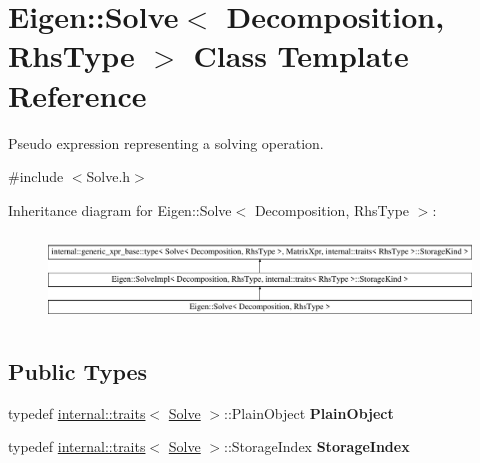 \hypertarget{class_eigen_1_1_solve}{}\section{Eigen\+::Solve$<$ Decomposition, Rhs\+Type $>$ Class Template Reference}
\label{class_eigen_1_1_solve}


Pseudo expression representing a solving operation.  




{\ttfamily \#include $<$Solve.\+h$>$}

Inheritance diagram for Eigen\+::Solve$<$ Decomposition, Rhs\+Type $>$\+:\begin{figure}[H]
\begin{center}
\leavevmode
\includegraphics[height=2.343096cm]{class_eigen_1_1_solve}
\end{center}
\end{figure}
\subsection*{Public Types}
\begin{DoxyCompactItemize}
\item 
\mbox{\label{class_eigen_1_1_solve_a07e840fd2115e2333487c179df5408a9}} 
typedef \mbox{\hyperlink{struct_eigen_1_1internal_1_1traits}{internal\+::traits}}$<$ \mbox{\hyperlink{class_eigen_1_1_solve}{Solve}} $>$\+::Plain\+Object {\bfseries Plain\+Object}
\item 
\mbox{\label{class_eigen_1_1_solve_a64f2c1bc160d89f106a8cd9fd6c0236c}} 
typedef \mbox{\hyperlink{struct_eigen_1_1internal_1_1traits}{internal\+::traits}}$<$ \mbox{\hyperlink{class_eigen_1_1_solve}{Solve}} $>$\+::Storage\+Index {\bfseries Storage\+Index}
\end{DoxyCompactItemize}
